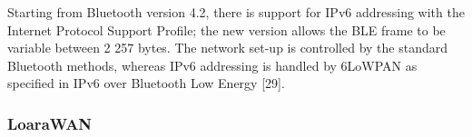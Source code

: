 Starting from Bluetooth version 4.2,
	there is support for IPv6 addressing with the Internet Protocol Support Profile;
	the new version allows the BLE frame to be variable between 2 257 bytes.
The network set-up is controlled by the standard Bluetooth methods,
	whereas IPv6 addressing is handled by 6LoWPAN as specified in IPv6 over Bluetooth Low Energy [29].

\subsubsection{LoaraWAN}

\clearpage

\begin{figure}
\begin{bytefield}[bitwidth=1.2em]{32}
	                                                  \\


\end{bytefield}
\end{figure}
